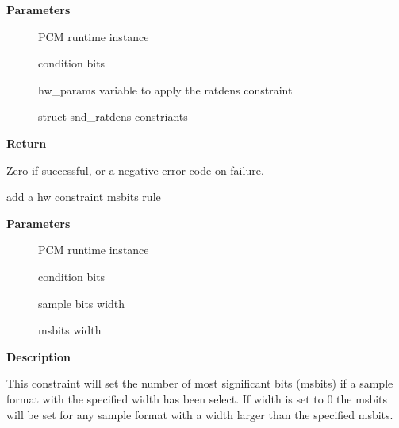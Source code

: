 \documentclass[a4paper,8pt,english]{sphinxmanual}
\begin{document}
\textbf{Parameters}
\begin{description}
\item[{}] \leavevmode
PCM runtime instance

\item[{}] \leavevmode
condition bits

\item[{}] \leavevmode
hw\_params variable to apply the ratdens constraint

\item[{}] \leavevmode
struct snd\_ratdens constriants

\end{description}

\textbf{Return}

Zero if successful, or a negative error code on failure.

\begin{fulllineitems}
\label{sound/kernel-api/alsa-driver-api:c.snd_pcm_hw_constraint_msbits}
add a hw constraint msbits rule

\end{fulllineitems}


\textbf{Parameters}
\begin{description}
\item[{}] \leavevmode
PCM runtime instance

\item[{}] \leavevmode
condition bits

\item[{}] \leavevmode
sample bits width

\item[{}] \leavevmode
msbits width

\end{description}

\textbf{Description}

This constraint will set the number of most significant bits (msbits) if a
sample format with the specified width has been select. If width is set to 0
the msbits will be set for any sample format with a width larger than the
specified msbits.
\end{document}
